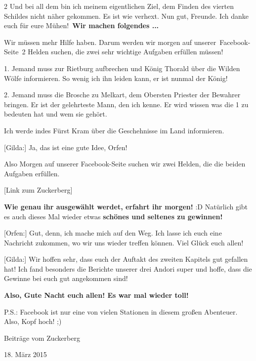 \documentclass[10pt, a4paper, oneside]{book}
\begin{document}
\begin{multicols}{2}
Und bei all dem bin ich meinem eigentlichen Ziel, dem Finden des vierten Schildes nicht näher gekommen. Es ist wie verhext. Nun gut, Freunde. Ich danke euch für eure Mühen! \textbf{Wir machen folgendes ...}

Wir müssen mehr Hilfe haben. Darum werden wir morgen auf unserer Facebook-Seite 2 Helden suchen, die zwei sehr wichtige Aufgaben erfüllen müssen!

1. Jemand muss zur Rietburg aufbrechen und König Thorald über die Wilden Wölfe informieren. So wenig ich ihn leiden kann, er ist nunmal der König!

2. Jemand muss die Brosche zu Melkart, dem Obersten Priester der Bewahrer bringen. Er ist der gelehrteste Mann, den ich kenne. Er wird wissen was die 1 zu bedeuten hat und wem sie gehört.

Ich werde indes Fürst Kram über die Geschehnisse im Land informieren.

[Gilda:] Ja, das ist eine gute Idee, Orfen!

Also Morgen auf unserer Facebook-Seite suchen wir zwei Helden, die die beiden Aufgaben erfüllen.

[Link zum Zuckerberg]

\textbf{Wie genau ihr ausgewählt werdet, erfahrt ihr morgen!} :D
Natürlich gibt es auch dieses Mal wieder etwas \textbf{schönes und seltenes zu gewinnen!}

[Orfen:] Gut, denn, ich mache mich auf den Weg. Ich lasse ich euch eine Nachricht zukommen, wo wir uns wieder treffen können. Viel Glück euch allen!

[Gilda:] Wir hoffen sehr, dass euch der Auftakt des zweiten Kapitels gut gefallen hat! Ich fand besonders die Berichte unserer drei Andori super und hoffe, dass die Gewinne bei euch gut angekommen sind!

\textbf{Also, Gute Nacht euch allen! Es war mal wieder toll!}

P.S.: Facebook ist nur eine von vielen Stationen in diesem großen Abenteuer. Also, Kopf hoch! ;)


\begin{center}
    Beiträge vom Zuckerberg

    18. März 2015
\end{center}




\end{multicols}
\end{document}
